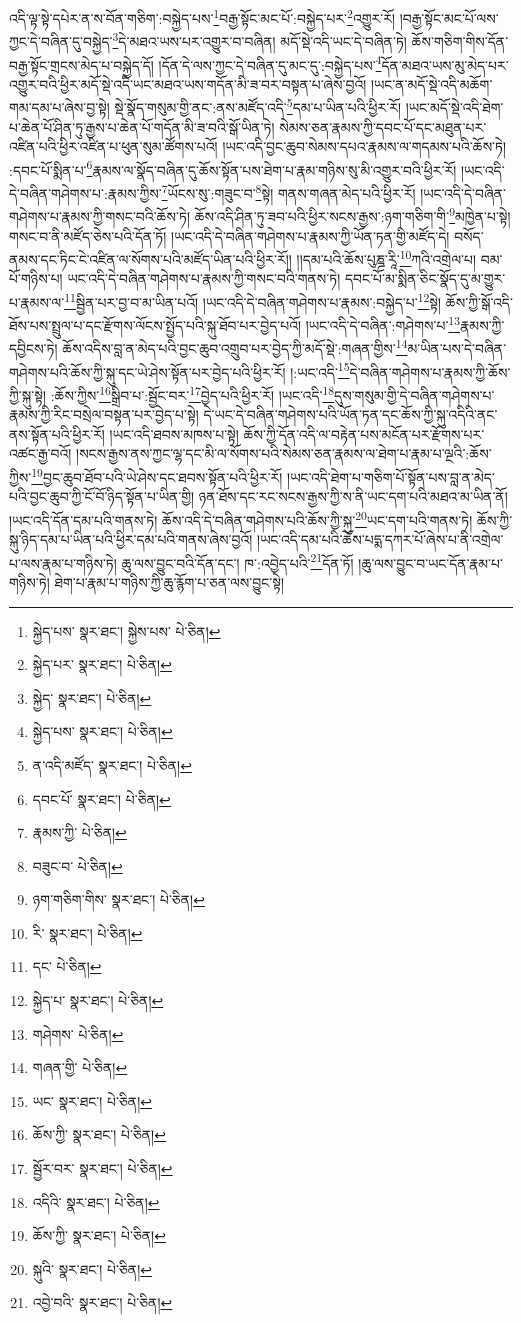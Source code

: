 འདི་ལྟ་སྟེ་དཔེར་ན་ས་བོན་གཅིག་:བསྐྱེད་པས་\footnote{སྐྱེད་པས་  སྣར་ཐང་། སྐྱེས་པས་  པེ་ཅིན། }བརྒྱ་སྟོང་མང་པོ་:བསྐྱེད་པར་\footnote{སྐྱེད་པར་  སྣར་ཐང་།  པེ་ཅིན། }འགྱུར་རོ། །བརྒྱ་སྟོང་མང་པོ་ལས་ཀྱང་དེ་བཞིན་དུ་བསྐྱེད་\footnote{སྐྱེད་  སྣར་ཐང་།  པེ་ཅིན། }དེ་མཐའ་ཡས་པར་འགྱུར་བ་བཞིན། མདོ་སྡེ་འདི་ཡང་དེ་བཞིན་ཏེ། ཆོས་གཅིག་གིས་དོན་བརྒྱ་སྟོང་གྲངས་མེད་པ་བསྐྱེད་དོ། །དོན་དེ་ལས་ཀྱང་དེ་བཞིན་དུ་མང་དུ་:བསྐྱེད་པས་\footnote{སྐྱེད་པས་  སྣར་ཐང་།  པེ་ཅིན། }དོན་མཐའ་ཡས་མུ་མེད་པར་འགྱུར་བའི་ཕྱིར་མདོ་སྡེ་འདི་ཡང་མཐའ་ཡས་གདོན་མི་ཟ་བར་བསྟན་པ་ཞེས་བྱའོ། །ཡང་ན་མདོ་སྡེ་འདི་མཆོག་གམ་དམ་པ་ཞེས་བྱ་སྟེ། སྡེ་སྣོད་གསུམ་གྱི་ནང་:ནས་མཛོད་འདི་\footnote{ན་འདི་མཛོད་  སྣར་ཐང་།  པེ་ཅིན། }དམ་པ་ཡིན་པའི་ཕྱིར་རོ། །ཡང་མདོ་སྡེ་འདི་ཐེག་པ་ཆེན་པོ་ཤིན་ཏུ་རྒྱས་པ་ཆེན་པོ་གདོན་མི་ཟ་བའི་སྒོ་ཡིན་ཏེ། སེམས་ཅན་རྣམས་ཀྱི་དབང་པོ་དང་མཐུན་པར་འཛིན་པའི་ཕྱིར་འཛིན་པ་ཕུན་སུམ་ཚོགས་པའོ། །ཡང་འདི་བྱང་ཆུབ་སེམས་དཔའ་རྣམས་ལ་གདམས་པའི་ཆོས་ཏེ། :དབང་པོ་སྨིན་པ་\footnote{དབང་པོ་  སྣར་ཐང་།  པེ་ཅིན། }རྣམས་ལ་སྣོད་བཞིན་དུ་ཆོས་སྟོན་པས་ཐེག་པ་རྣམ་གཉིས་སུ་མི་འགྱུར་བའི་ཕྱིར་རོ། །ཡང་འདི་དེ་བཞིན་གཤེགས་པ་:རྣམས་ཀྱིས་\footnote{རྣམས་ཀྱི་  པེ་ཅིན། }ཡོངས་སུ་:གཟུང་བ་\footnote{བཟུང་བ་  པེ་ཅིན། }སྟེ། གནས་གཞན་མེད་པའི་ཕྱིར་རོ། །ཡང་འདི་དེ་བཞིན་གཤེགས་པ་རྣམས་ཀྱི་གསང་བའི་ཆོས་ཏེ། ཆོས་འདི་ཤིན་ཏུ་ཟབ་པའི་ཕྱིར་སངས་རྒྱས་:ཉག་གཅིག་གི་\footnote{ཉག་གཅིག་གིས་  སྣར་ཐང་།  པེ་ཅིན། }མཁྱེན་པ་སྟེ། གསང་བ་ནི་མཛོད་ཅེས་པའི་དོན་ཏོ། །ཡང་འདི་དེ་བཞིན་གཤེགས་པ་རྣམས་ཀྱི་ཡོན་ཏན་གྱི་མཛོད་དེ། བསོད་ནམས་དང་ཏིང་ངེ་འཛིན་ལ་སོགས་པའི་མཛོད་ཡིན་པའི་ཕྱིར་རོ།། །།དམ་པའི་ཆོས་པུཎྜ་རཱི་\footnote{རི་  སྣར་ཐང་།  པེ་ཅིན། }ཀའི་འགྲེལ་པ། བམ་པོ་གཉིས་པ། ཡང་འདི་དེ་བཞིན་གཤེགས་པ་རྣམས་ཀྱི་གསང་བའི་གནས་ཏེ། དབང་པོ་མ་སྨིན་ཅིང་སྣོད་དུ་མ་གྱུར་པ་རྣམས་ལ་\footnote{དང་  པེ་ཅིན། }སྦྱིན་པར་བྱ་བ་མ་ཡིན་པའོ། །ཡང་འདི་དེ་བཞིན་གཤེགས་པ་རྣམས་:བསྐྱེད་པ་\footnote{སྐྱེད་པ་  སྣར་ཐང་།  པེ་ཅིན། }སྟེ། ཆོས་ཀྱི་སྒོ་འདི་ཐོས་པས་སྤྲུལ་པ་དང་རྫོགས་ལོངས་སྤྱོད་པའི་སྐུ་ཐོབ་པར་བྱེད་པའོ། །ཡང་འདི་དེ་བཞིན་:གཤེགས་པ་\footnote{གཤེགས་  པེ་ཅིན། }རྣམས་ཀྱི་དབྱིངས་ཏེ། ཆོས་འདིས་བླ་ན་མེད་པའི་བྱང་ཆུབ་འགྲུབ་པར་བྱེད་ཀྱི་མདོ་སྡེ་:གཞན་གྱིས་\footnote{གཞན་གྱི་  པེ་ཅིན། }མ་ཡིན་པས་དེ་བཞིན་གཤེགས་པའི་ཆོས་ཀྱི་སྐུ་དང་ཡེ་ཤེས་སྟོན་པར་བྱེད་པའི་ཕྱིར་རོ། །:ཡང་འདི་\footnote{ཡང་  སྣར་ཐང་།  པེ་ཅིན། }དེ་བཞིན་གཤེགས་པ་རྣམས་ཀྱི་ཆོས་ཀྱི་སྐུ་སྟེ། :ཆོས་ཀྱིས་\footnote{ཆོས་ཀྱི་  སྣར་ཐང་།  པེ་ཅིན། }སྒྲིབ་པ་:སྦྱོང་བར་\footnote{སྦྱོར་བར་  སྣར་ཐང་།  པེ་ཅིན། }བྱེད་པའི་ཕྱིར་རོ། །ཡང་འདི་\footnote{འདིའི་  སྣར་ཐང་།  པེ་ཅིན། }དུས་གསུམ་གྱི་དེ་བཞིན་གཤེགས་པ་རྣམས་ཀྱི་རིང་བསྲེལ་བསྟན་པར་བྱེད་པ་སྟེ། དེ་ཡང་དེ་བཞིན་གཤེགས་པའི་ཡོན་ཏན་དང་ཆོས་ཀྱི་སྐུ་འདིའི་ནང་ནས་སྟོན་པའི་ཕྱིར་རོ། །ཡང་འདི་ཐབས་མཁས་པ་སྟེ། ཆོས་ཀྱི་དོན་འདི་ལ་བརྟེན་པས་མངོན་པར་རྫོགས་པར་འཚང་རྒྱ་བའོ། །སངས་རྒྱས་ནས་ཀྱང་ལྷ་དང་མི་ལ་སོགས་པའི་སེམས་ཅན་རྣམས་ལ་ཐེག་པ་རྣམ་པ་ལྔའི་:ཆོས་ཀྱིས་\footnote{ཆོས་ཀྱི་  སྣར་ཐང་།  པེ་ཅིན། }བྱང་ཆུབ་ཐོབ་པའི་ཡེ་ཤེས་དང་ཐབས་སྟོན་པའི་ཕྱིར་རོ། །ཡང་འདི་ཐེག་པ་གཅིག་པོ་སྟོན་པས་བླ་ན་མེད་པའི་བྱང་ཆུབ་ཀྱི་ངོ་བོ་ཉིད་སྟོན་པ་ཡིན་གྱི། ཉན་ཐོས་དང་རང་སངས་རྒྱས་ཀྱི་ས་ནི་ཡང་དག་པའི་མཐའ་མ་ཡིན་ནོ། །ཡང་འདི་དོན་དམ་པའི་གནས་ཏེ། ཆོས་འདི་དེ་བཞིན་གཤེགས་པའི་ཆོས་ཀྱི་སྐུ་\footnote{སྐུའི་  སྣར་ཐང་།  པེ་ཅིན། }ཡང་དག་པའི་གནས་ཏེ། ཆོས་ཀྱི་སྐུ་ཉིད་དམ་པ་ཡིན་པའི་ཕྱིར་དམ་པའི་གནས་ཞེས་བྱའོ། །ཡང་འདི་དམ་པའི་ཆོས་པདྨ་དཀར་པོ་ཞེས་པ་ནི་འགྲེལ་པ་ལས་རྣམ་པ་གཉིས་ཏེ། ཆུ་ལས་བྱུང་བའི་དོན་དང་། ཁ་:འབྱེད་པའི་\footnote{འབྱེ་བའི་  སྣར་ཐང་།  པེ་ཅིན། }དོན་ཏོ། །ཆུ་ལས་བྱུང་བ་ཡང་དོན་རྣམ་པ་གཉིས་ཏེ། ཐེག་པ་རྣམ་པ་གཉིས་ཀྱི་ཆུ་རྙོག་པ་ཅན་ལས་བྱུང་སྟེ། 